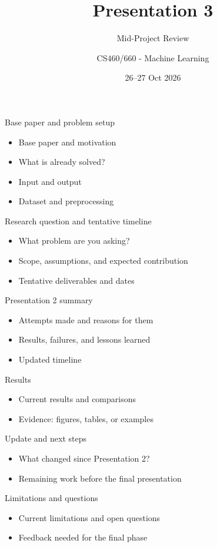 \documentclass[aspectratio=169]{beamer}
\title{Presentation 3}
\subtitle{Mid-Project Review}
\author{CS460/660 - Machine Learning}
\date{26--27 Oct 2026}
\begin{document}
\begin{frame}{Base paper and problem setup}
\begin{itemize}
  \item Base paper and motivation
  \item What is already solved?
  \item Input and output
  \item Dataset and preprocessing
\end{itemize}
\end{frame}
\begin{frame}{Research question and tentative timeline}
\begin{itemize}
  \item What problem are you asking?
  \item Scope, assumptions, and expected contribution
  \item Tentative deliverables and dates
\end{itemize}
\end{frame}
\begin{frame}{Presentation 2 summary}
\begin{itemize}
  \item Attempts made and reasons for them
  \item Results, failures, and lessons learned
  \item Updated timeline
\end{itemize}
\end{frame}
\begin{frame}{Results}
\begin{itemize}
  \item Current results and comparisons
  \item Evidence: figures, tables, or examples
\end{itemize}
\end{frame}
\begin{frame}{Update and next steps}
\begin{itemize}
  \item What changed since Presentation 2?
  \item Remaining work before the final presentation
\end{itemize}
\end{frame}
\begin{frame}{Limitations and questions}
\begin{itemize}
  \item Current limitations and open questions
  \item Feedback needed for the final phase
\end{itemize}
\end{frame}
\end{document}
